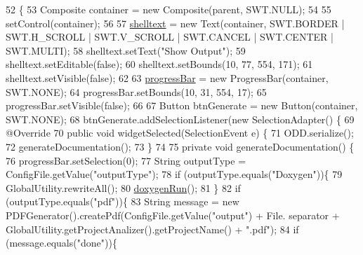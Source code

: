 \begin{DoxyCode}
52                                                 \{
53         Composite container = \textcolor{keyword}{new} Composite(parent, SWT.NULL);
54 
55         setControl(container);
56         
57         \hyperlink{classit_1_1isislab_1_1masonhelperdocumentation_1_1mason_1_1wizards_1_1_q___end_wizard_ab4650e9141ffb45563506bcf2b5daa4e}{shelltext} = \textcolor{keyword}{new} Text(container, SWT.BORDER | SWT.H\_SCROLL | SWT.V\_SCROLL | SWT.CANCEL | 
      SWT.CENTER | SWT.MULTI);
58         shelltext.setText(\textcolor{stringliteral}{"Show Output"});
59         shelltext.setEditable(\textcolor{keyword}{false});
60         shelltext.setBounds(10, 77, 554, 171);
61         shelltext.setVisible(\textcolor{keyword}{false});
62         
63         \hyperlink{classit_1_1isislab_1_1masonhelperdocumentation_1_1mason_1_1wizards_1_1_q___end_wizard_a43d65086e656c40478f720a0a9cac522}{progressBar} = \textcolor{keyword}{new} ProgressBar(container, SWT.NONE);
64         progressBar.setBounds(10, 31, 554, 17);
65         progressBar.setVisible(\textcolor{keyword}{false});
66         
67         Button btnGenerate = \textcolor{keyword}{new} Button(container, SWT.NONE);
68         btnGenerate.addSelectionListener(\textcolor{keyword}{new} SelectionAdapter() \{
69             @Override
70             \textcolor{keyword}{public} \textcolor{keywordtype}{void} widgetSelected(SelectionEvent e) \{
71                 ODD.serialize();
72                 generateDocumentation();
73             \}
74 
75             \textcolor{keyword}{private} \textcolor{keywordtype}{void} generateDocumentation() \{
76                 progressBar.setSelection(0);
77                 String outputType = ConfigFile.getValue(\textcolor{stringliteral}{"outputType"});
78                 \textcolor{keywordflow}{if} (outputType.equals(\textcolor{stringliteral}{"Doxygen"}))\{
79                     GlobalUtility.rewriteAll();
80                     \hyperlink{classit_1_1isislab_1_1masonhelperdocumentation_1_1mason_1_1wizards_1_1_q___end_wizard_a5711bf4858bd7e5787743ec96669a19d}{doxygenRun}(); 
81                 \}
82                 \textcolor{keywordflow}{if} (outputType.equals(\textcolor{stringliteral}{"pdf"}))\{
83                     String message = \textcolor{keyword}{new} PDFGenerator().createPdf(ConfigFile.getValue(\textcolor{stringliteral}{"output"}) + File.
      separator + GlobalUtility.getProjectAnalizer().getProjectName() + \textcolor{stringliteral}{".pdf"});
84                     \textcolor{keywordflow}{if} (message.equals(\textcolor{stringliteral}{"done"}))\{

\end{DoxyCode}
